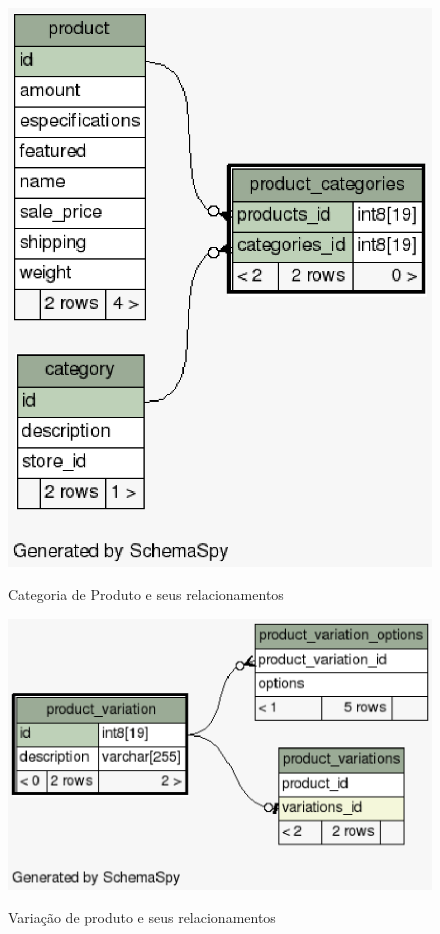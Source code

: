 \documentclass[a4paper,12pt]{monografia}
\begin{document}
\begin{figure}[H]
\centering
\caption{Categoria de Produto e seus relacionamentos}
\centering
\includegraphics[scale=0.7]{img/diagramas/schema/product_categories.1degree.png.eps}\\
\end{figure}

\begin{figure}[H]
\centering
\caption{Variação de produto e seus relacionamentos}
\centering
\includegraphics[scale=0.7]{img/diagramas/schema/product_variation.1degree.png.eps}\\
\end{figure}
\end{document}
